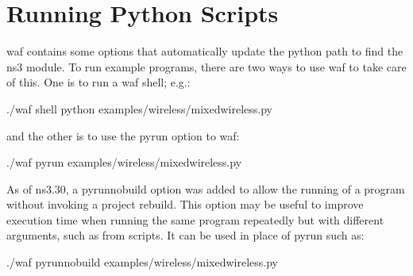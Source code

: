 \documentclass[letterpaper,10pt,english]{sphinxmanual}
\begin{document}
\begin{sphinxVerbatim}[commandchars=\\\{\}]
  

\end{sphinxVerbatim}


\section{Running Python Scripts}
\label{\detokenize{python:running-python-scripts}}
waf contains some options that automatically update the python path to find the ns3 module.  To run example programs, there are two ways to use waf to take care of this.  One is to run a waf shell; e.g.:

\begin{sphinxVerbatim}[commandchars=\\\{\}]
\PYGZdl{} ./waf shell
\PYGZdl{} python examples/wireless/mixed\PYGZhy{}wireless.py
\end{sphinxVerbatim}

and the other is to use the \textendash{}pyrun option to waf:

\begin{sphinxVerbatim}[commandchars=\\\{\}]
\PYGZdl{} ./waf \PYGZhy{}\PYGZhy{}pyrun examples/wireless/mixed\PYGZhy{}wireless.py
\end{sphinxVerbatim}

As of ns\sphinxhyphen{}3.30, a \textendash{}pyrun\sphinxhyphen{}no\sphinxhyphen{}build option was added to allow the running of
a program without invoking a project rebuild.  This option may be useful
to improve execution time when running the same program repeatedly but with
different arguments, such as from scripts. It can be used in place of
\textendash{}pyrun such as:

\begin{sphinxVerbatim}[commandchars=\\\{\}]
\PYGZdl{} ./waf \PYGZhy{}\PYGZhy{}pyrun\PYGZhy{}no\PYGZhy{}build examples/wireless/mixed\PYGZhy{}wireless.py
\end{sphinxVerbatim}
\end{document}
